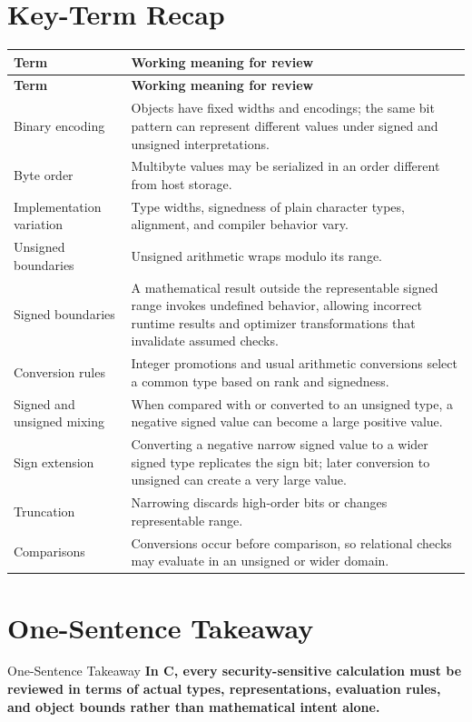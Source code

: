 \documentclass[11pt,letterpaper]{article}
\begin{document}
\section{Key-Term Recap}
\begin{longtable}{>{\raggedright\arraybackslash}p{}p{}}
\toprule
\textbf{Term} & \textbf{Working meaning for review} \\
\midrule
\endfirsthead
\toprule
\textbf{Term} & \textbf{Working meaning for review} \\
\midrule
\endhead
Binary encoding & Objects have fixed widths and encodings; the same bit pattern can represent different values under signed and unsigned interpretations. \\
Byte order & Multibyte values may be serialized in an order different from host storage. \\
Implementation variation & Type widths, signedness of plain character types, alignment, and compiler behavior vary. \\
Unsigned boundaries & Unsigned arithmetic wraps modulo its range. \\
Signed boundaries & A mathematical result outside the representable signed range invokes undefined behavior, allowing incorrect runtime results and optimizer transformations that invalidate assumed checks. \\
Conversion rules & Integer promotions and usual arithmetic conversions select a common type based on rank and signedness. \\
Signed and unsigned mixing & When compared with or converted to an unsigned type, a negative signed value can become a large positive value. \\
Sign extension & Converting a negative narrow signed value to a wider signed type replicates the sign bit; later conversion to unsigned can create a very large value. \\
Truncation & Narrowing discards high-order bits or changes representable range. \\
Comparisons & Conversions occur before comparison, so relational checks may evaluate in an unsigned or wider domain. \\
\bottomrule
\end{longtable}
\section{One-Sentence Takeaway}
\begin{CornellExamBox}{One-Sentence Takeaway}
\textbf{In C, every security-sensitive calculation must be reviewed in terms of actual types, representations, evaluation rules, and object bounds rather than mathematical intent alone.}
\end{CornellExamBox}
\end{document}
